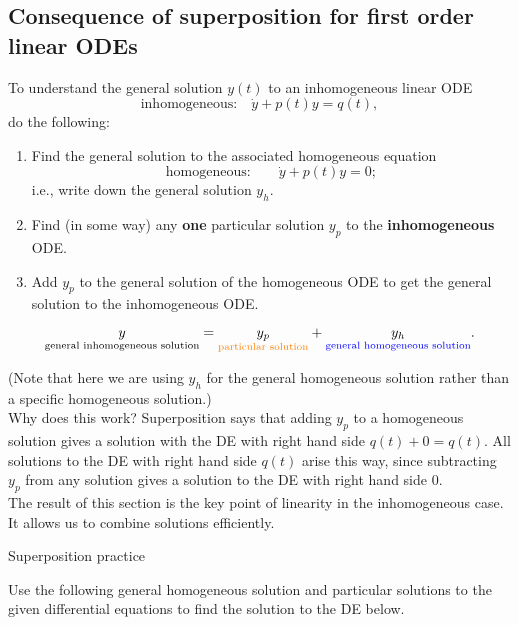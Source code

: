 \subsection{Consequence of superposition for first order linear ODEs}
To understand the general solution $y(t)$ to an inhomogeneous linear ODE
\begin{equation*}
  \text {inhomogeneous:} \quad \dot y + p(t)y = q(t),
\end{equation*}
do the following:
\begin{enumerate}
\item Find the general solution to the associated homogeneous equation
  \begin{equation*}
    \text {homogeneous:}\qquad \dot y + p(t)y = 0;
  \end{equation*}
  i.e., write down the general solution $y_h$.
\item Find (in some way) any \textbf{one} particular solution $y_p$ to
  the \textbf{inhomogeneous} ODE.
\item Add $y_p$ to the general solution of the homogeneous ODE
  to get the general solution to the inhomogeneous ODE.
\end{enumerate}

\Summary
\begin{equation*}
  \underset {{\text {general inhomogeneous solution}}}{y} =
  \underset {{\color{orange}{\text {particular solution}}} }{y_ p} +
  \underset {{\color{blue}{\text {general homogeneous solution}}} }{y_ h}.
\end{equation*}

(Note that here we are using $y_h$ for the general homogeneous solution
rather than a specific homogeneous solution.)\\

Why does this work? Superposition says that adding $y_p$ to a homogeneous solution
gives a solution with the DE with right hand side $q(t) + 0 = q(t)$.
All solutions to the DE with right hand side $q(t)$ arise this way,
since subtracting $y_p$ from any solution gives a solution to the DE with right hand side $0$.\\

The result of this section is the key point of linearity in the inhomogeneous case.
It allows us to combine solutions efficiently.

\begin{exercise}
  Superposition practice
\end{exercise}

Use the following general homogeneous solution and particular solutions
to the given differential equations to find the solution to the DE below.

